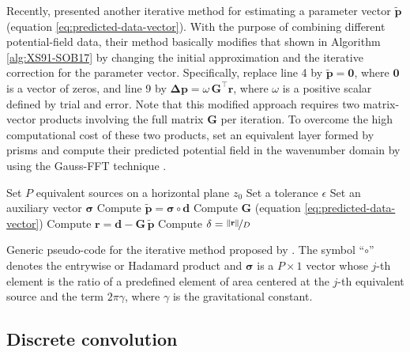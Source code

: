 Recently, \citet{jirigalatu-ebbing2019} presented another iterative method for estimating a parameter 
vector $\tilde{\mathbf{p}}$ (equation \ref{eq:predicted-data-vector}). 
With the purpose of combining different potential-field data, 
their method basically modifies that shown in Algorithm \ref{alg:XS91-SOB17} by changing the initial approximation 
and the iterative correction for the parameter vector.
Specifically, \citet{jirigalatu-ebbing2019} replace line 4 by $\tilde{\mathbf{p}} = \mathbf{0}$, where $\mathbf{0}$ is a vector of zeros,
and line 9 by $\boldsymbol{\Delta}\mathbf{p} = \omega \, \mathbf{G}^{\top} \mathbf{r}$, where $\omega$ is a positive
scalar defined by trial and error.
Note that this modified approach requires two matrix-vector products involving the full matrix $\mathbf{G}$ per iteration.
To overcome the high computational cost of these two products, \citet{jirigalatu-ebbing2019} set an equivalent layer formed by
prisms and compute their predicted potential field in the wavenumber domain by using the Gauss-FFT technique
\cite{zhao-etal2018}.

\begin{algorithm}
	\Input{}
	Set $P$ equivalent sources on a horizontal plane $z_{0}$ \;
	Set a tolerance $\epsilon$ \;
	Set an auxiliary vector $\boldsymbol{\sigma}$ \;
	Compute $\tilde{\mathbf{p}} = \boldsymbol{\sigma} \circ \mathbf{d}$ \;
	Compute $\mathbf{G}$ (equation \ref{eq:predicted-data-vector}) \;
	Compute $\mathbf{r} = \mathbf{d} - \mathbf{G} \, \tilde{\mathbf{p}}$ \;
	Compute $\delta = \nicefrac{\| \mathbf{r} \|}{D}$ \;
	\caption{Generic pseudo-code for the iterative method proposed by \cite{siqueira-etal2017}.
	The symbol ``$\circ$'' denotes the entrywise or Hadamard product \cite[e.g.,][p. 298]{horn-johnson1991} and
	$\boldsymbol{\sigma}$ is a $P \times 1$ vector whose $j$-th element is the ratio of a predefined element of area centered at the $j$-th
	equivalent source and the term $2 \pi \gamma$, where $\gamma$ is the gravitational constant.}
	\label{alg:XS91-SOB17}
\end{algorithm}

\subsection{Discrete convolution}


